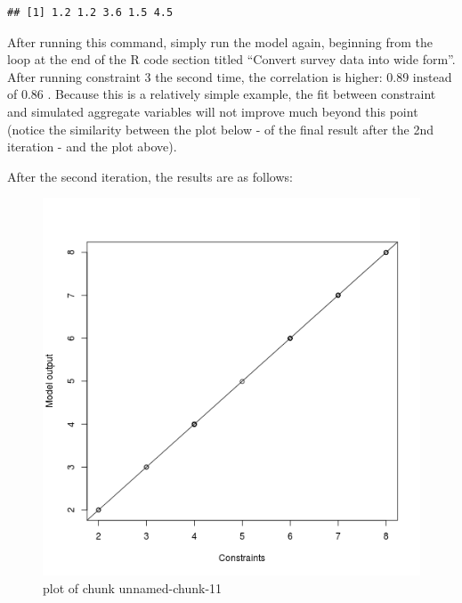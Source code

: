 \begin{Shaded}
\begin{Highlighting}[]
 
\NormalTok{weights3[, }\NormalTok{]}
\end{Highlighting}
\end{Shaded}
\begin{verbatim}
## [1] 1.2 1.2 3.6 1.5 4.5
\end{verbatim}
After running this command, simply run the model again, beginning from
the loop at the end of the R code section titled ``Convert survey data
into wide form''. After running constraint 3 the second time, the
correlation is higher: 0.89 instead of 0.86 . Because this is a
relatively simple example, the fit between constraint and simulated
aggregate variables will not improve much beyond this point (notice the
similarity between the plot below - of the final result after the 2nd
iteration - and the plot above).

After the second iteration, the results are as follows:

\begin{Shaded}
\begin{Highlighting}[]
\NormalTok{(}\NormalTok{(}\NormalTok{(} \NormalTok{, }
     \NormalTok{)}
\NormalTok{(} \NormalTok{, } \NormalTok{)}
\end{Highlighting}
\end{Shaded}
\begin{figure}[htbp]
\centering
\includegraphics{figure/unnamed-chunk-11.png}
\caption{plot of chunk unnamed-chunk-11}
\end{figure}


